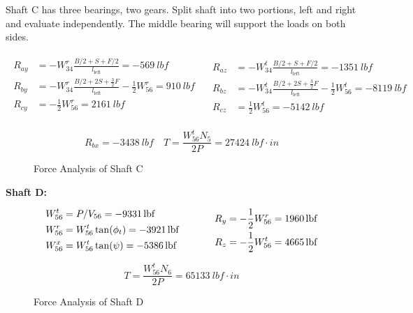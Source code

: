 \documentclass[titlepage]{article} %
\begin{document}
Shaft C has three bearings, two gears. Split shaft into two portions, left and
right and evaluate independently. The middle bearing will support the loads on both sides.

\begin{align*}
    \begin{split}
    R_{ay} &= -W^r_{34} \frac{B/2 + S + F/2}{l_{\text{left}}} = \SI{-569}{lbf} \\
    R_{by} &= -W^r_{34} \frac{B/2 + 2S + \frac{3}{2}F}{l_{\text{left}}} - \frac{1}{2}W^r_{56} = \SI{910}{lbf}\\
    R_{cy} &= -\frac{1}{2} W^r_{56} = \SI{2161}{lbf} \\
    \end{split}
    \quad
    \begin{split}
    R_{az} &= -W^t_{34} \frac{B/2 + S + F/2}{l_{\text{left}}} = \SI{-1351}{lbf} \\
    R_{bz} &= -W^t_{34} \frac{B/2 + 2S + \frac{3}{2}F}{l_{\text{left}}} - \frac{1}{2}W^t_{56} = \SI{-8119}{lbf} \\
    R_{cz} &= \frac{1}{2} W^t_{56} = \SI{-5142}{lbf} 
    \end{split}
\end{align*}

$$R_{bx} = \SI{-3438}{lbf} \quad T = \frac{W^t_{56} N_5}{2P} = \SI{27424}{lbf \cdot in} $$
\begin{figure}[h]
    \centering
    
    \caption{Force Analysis of Shaft C}
\end{figure}

\textbf{Shaft D:}

\begin{equation*}
\begin{split}
    W_{56}^t &= P/V_{56} = \SI{-9331}{lbf} \\
    W_{56}^r &= W_{56}^t \tan(\phi_t) = \SI{-3921}{lbf} \\
    W_{56}^x &= W_{56}^t \tan(\psi) = \SI{-5386}{lbf}
\end{split}
\hspace{0.5in}
\begin{split}
    R_y &= -\frac{1}{2}W_{56}^r = \SI{1960}{lbf} \\
    R_z &= -\frac{1}{2}W_{56}^t = \SI{4665}{lbf}
\end{split}
\end{equation*}

$$T = \frac{W^t_{56} N_6}{2P} = \SI{65133}{lbf \cdot in}$$

\begin{figure}[h!]
    \centering
    
    \caption{Force Analysis of Shaft D}
\end{figure}
    
\end{document}
